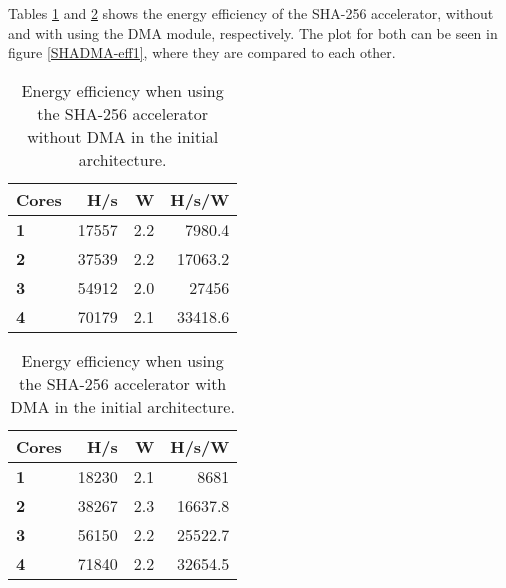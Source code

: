 \begin{appendix}
Tables \ref{tab:SHA-eff1} and \ref{tab:SHADMA-eff1} shows the energy efficiency of the SHA-256 accelerator, without and with using the DMA module, respectively.
The plot for both can be seen in figure \ref{SHADMA-eff1}, where they are compared to each other.

%

\begin{table}
\centering
\begin{tabular}{| l | r | r || r |}
  \hline 
  \textbf{Cores} & \textbf{H/s} & \textbf{W} & \textbf{H/s/W} \\
  \hline                       
  \textbf{1} &  17557 & 2.2 & 7980.4\\
  \textbf{2} &  37539 & 2.2 & 17063.2\\
  \textbf{3} &  54912 & 2.0 & 27456\\
  \textbf{4} &  70179 & 2.1 & 33418.6\\
  \hline 
\end{tabular}
\caption{Energy efficiency when using the SHA-256 accelerator without DMA in the initial architecture.}
\label{tab:SHA-eff1}
\end{table}

\begin{table}
\centering
\begin{tabular}{| l | r | r || r |}
  \hline 
  \textbf{Cores} & \textbf{H/s} & \textbf{W} & \textbf{H/s/W} \\
  \hline                       
  \textbf{1} &  18230 & 2.1 & 8681\\
  \textbf{2} &  38267 & 2.3 & 16637.8\\
  \textbf{3} &  56150 & 2.2 & 25522.7\\
  \textbf{4} &  71840 & 2.2 & 32654.5\\
  \hline 
\end{tabular}
\caption{Energy efficiency when using the SHA-256 accelerator with DMA in the initial architecture.}
\label{tab:SHADMA-eff1}
\end{table}


\end{appendix}
